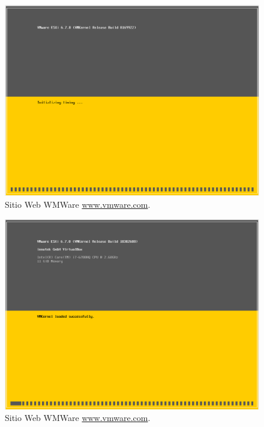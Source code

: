 \begin{figure}[!hbtp]
	\centering
	\includegraphics[width=\linewidth]{Trabajo/RecursosEducativos/RE01_VMwareESXi/RE_VMwareInstalacion03.png}
	\vspace{-0.2cm}
	\caption{Sitio Web WMWare \url{www.vmware.com}.\footnotemark[2]{} }
	\label{fig:VMwareInstalacion03}
\end{figure}

\begin{figure}[!hbtp]
	\centering
	\includegraphics[width=\linewidth]{Trabajo/RecursosEducativos/RE01_VMwareESXi/RE_VMwareInstalacion04.png}
	\vspace{-0.2cm}
	\caption{Sitio Web WMWare \url{www.vmware.com}.\footnotemark[2]{} }
	\label{fig:VMwareInstalacion04}
\end{figure}

